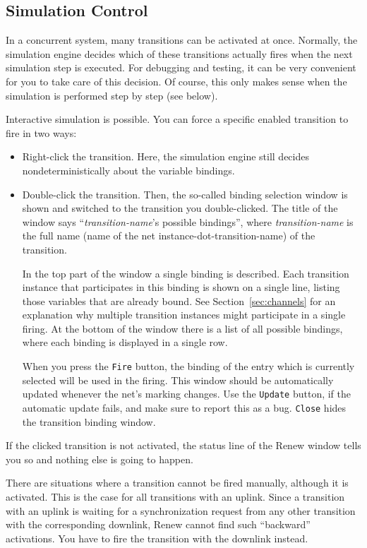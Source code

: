 \subsection{Simulation Control}

In a concurrent system, many transitions can be activated at
once.
Normally, the simulation engine decides which of these
transitions actually fires when the next simulation step
is executed.
For debugging and testing, it can be very convenient for
you to take care of this decision. Of course, this only
makes sense when the simulation is performed step by step
(see below).

Interactive simulation is possible.
You can force a specific enabled transition to fire in two ways:
\begin{itemize}
\item Right-click the transition. Here, the simulation engine
  still decides nondeterministically about the variable bindings.
\item Double-click the transition. Then, the so-called
  binding selection window is shown and switched to the
  transition you double-clicked. The title of the window
  says ``{\em transition-name\/}'s possible bindings'', where
  {\em transition-name\/} is the full name (name of the net
  instance-dot-transition-name) of the transition.

  In the top part of the window a single binding is described.
  Each transition instance that participates in this binding
  is shown on a single line, listing
  those variables that are already bound.
  See Section~\ref{sec:channels} for an explanation why multiple
  transition instances might participate in a single firing.
  At the bottom of the window there is a list of all possible
  bindings, where each binding is displayed in a single row.

  When you press the \texttt{Fire} button, the binding of the
  entry which is currently selected will be used in the firing.
  This window should be automatically updated whenever the net's
  marking changes. Use the \texttt{Update} button, if the
  automatic update fails, and make sure to report this as a bug.
  \texttt{Close} hides the transition binding window.
\end{itemize}
%
If the clicked transition is not activated, the status line
of the Renew window tells you so and nothing else is going to
happen.

There are situations where a transition cannot be fired
manually, although it is activated. This is the case for
all transitions with an uplink. Since a transition with an
uplink is waiting for a synchronization request from any
other transition with the corresponding downlink,
Renew cannot find such ``backward'' activations.
You have to fire the transition with the downlink instead.

